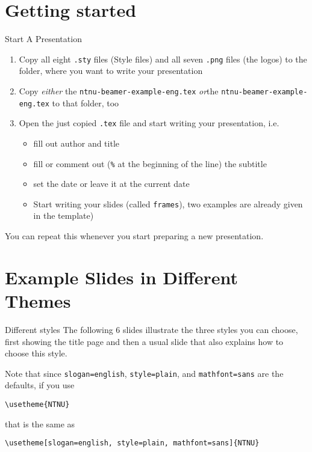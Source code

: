 \documentclass[aspectratio=169]{beamer}
\begin{document}
	\section{Getting started}
		\begin{frame}[fragile]{Start A Presentation}
			\label{slide:start}
			\begin{enumerate}
				\item Copy all eight \lstinline!.sty! files (Style files) and all seven \lstinline!.png! files (the logos) to the folder, where you want to write your presentation
				\item Copy \emph{either} the \lstinline!ntnu-beamer-example-eng.tex! \emph{or}the \lstinline!ntnu-beamer-example-eng.tex! to that folder, too
				\item Open the just copied \lstinline!.tex! file and start writing your presentation, i.e.
				\begin{itemize}
					\item fill out author and title
					\item fill or comment out (\lstinline!%! at the beginning of the line) the subtitle
					\item set the date or leave it at the current date
					\item Start writing your slides (called \lstinline!frames!), two examples are already given in the template)
				\end{itemize}
			\end{enumerate}
			You can repeat this whenever you start preparing a new presentation.
		\end{frame}
	\section{Example Slides in Different Themes}
	\begin{frame}[fragile]{Different styles}
		\label{slide:styles-demo}
		The following 6 slides illustrate the three styles you can choose,
		first showing the title page and then a usual slide that also explains how to choose this style.

		Note that since \lstinline!slogan=english!, \lstinline!style=plain!, and \lstinline!mathfont=sans! are the defaults, if you use

		\lstinline!\usetheme{NTNU}!

		that is the same as

		\lstinline!\usetheme[slogan=english, style=plain, mathfont=sans]{NTNU}!
	\end{frame}
	{
		
		
		
	}
\end{document}
